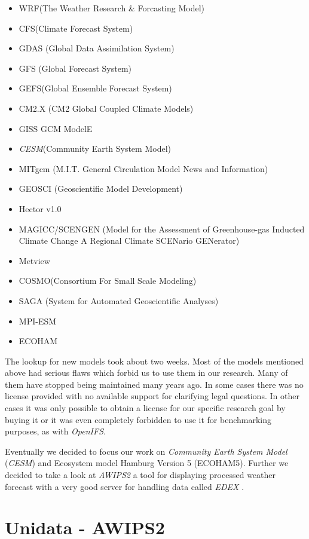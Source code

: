 \documentclass[]{article}
\providecommand{\tightlist}{%
  \setlength{\itemsep}{0pt}\setlength{\parskip}{0pt}}
\begin{document}
\begin{itemize}
\tightlist
\item
  WRF(The Weather Research \& Forcasting Model)
\item
  CFS(Climate Forecast System)
\item
  GDAS (Global Data Assimilation System)
\item
  GFS (Global Forecast System)
\item
  GEFS(Global Ensemble Forecast System)
\item
  CM2.X (CM2 Global Coupled Climate Models)
\item
  GISS GCM ModelE
\item
  \emph{CESM}(Community Earth System Model)
\item
  MITgcm (M.I.T. General Circulation Model News and Information)
\item
  GEOSCI (Geoscientific Model Development)
\item
  Hector v1.0
\item
  MAGICC/SCENGEN (Model for the Assessment of Greenhouse-gas Inducted
  Climate Change A Regional Climate SCENario GENerator)
\item
  Metview
\item
  COSMO(Consortium For Small Scale Modeling)
\item
  SAGA (System for Automated Geoscientific Analyses)
\item
  MPI-ESM
\item
  ECOHAM
\end{itemize}

The lookup for new models took about two weeks. Most of the models
mentioned above had serious flaws which forbid us to use them in our
research. Many of them have stopped being maintained many years ago. In
some cases there was no license provided with no available support for
clarifying legal questions. In other cases it was only possible to
obtain a license for our specific research goal by buying it or it was
even completely forbidden to use it for benchmarking purposes, as with
\emph{OpenIFS}.

Eventually we decided to focus our work on \emph{Community Earth System
Model} (\emph{CESM}) and Ecosystem model Hamburg Version 5 (ECOHAM5).
Further we decided to take a look at \emph{AWIPS2} a tool for displaying
processed weather forecast with a very good server for handling data
called \emph{EDEX} .

\pagebreak

\section{Unidata - AWIPS2}\label{unidata---awips2}
\end{document}
